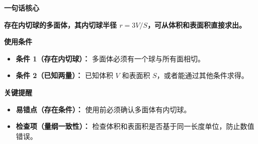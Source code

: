 \begin{summarybox}
	\textbf{\textcolor{CSummary}{一句话核心}}

	\textbf{存在内切球的多面体，其内切球半径 $r = 3V/S$，可从体积和表面积直接求出。}

	\medskip
	\textbf{\textcolor{CSummary}{使用条件}}
	\begin{itemize}[leftmargin=*, itemsep=0.5em, topsep=0.4em]
		\item \textbf{条件 1（存在内切球）：} 多面体必须有一个球与所有面相切。
		\item \textbf{条件 2（已知两量）：} 已知体积 $V$ 和表面积 $S$，或者能通过其他条件求得。
	\end{itemize}

	\medskip
	\textbf{\textcolor{CSummary}{关键提醒}}
	\begin{itemize}[leftmargin=*, itemsep=0.5em, topsep=0.4em]
		\item \textbf{易错点（存在条件）：} 使用前必须确认多面体有内切球。
		\item \textbf{检查项（量纲一致性）：} 检查体积和表面积是否基于同一长度单位，防止数值错误。
	\end{itemize}
\end{summarybox}
